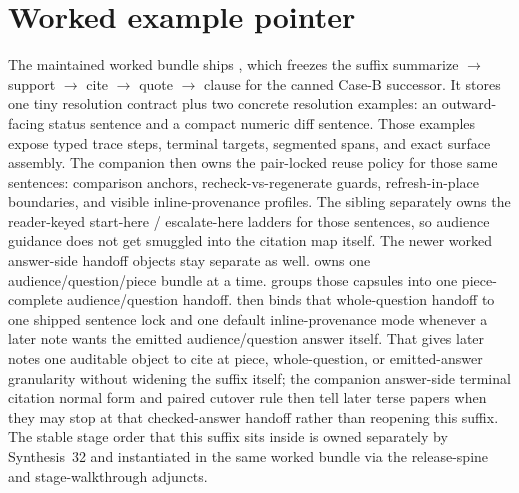 \documentclass[11pt]{article}
\begin{document}
\section{Worked example pointer}
The maintained worked bundle ships , which freezes the suffix
\textsf{summarize} $\to$ \textsf{support} $\to$ \textsf{cite} $\to$ \textsf{quote} $\to$ \textsf{clause}
for the canned Case-B successor.\cite{series:workedexample}
It stores one tiny resolution contract plus two concrete resolution examples: an outward-facing status sentence and a compact numeric diff sentence.
Those examples expose typed trace steps, terminal targets, segmented spans, and exact surface assembly.
The companion  then owns the pair-locked reuse policy for those same sentences: comparison anchors, recheck-vs-regenerate guards, refresh-in-place boundaries, and visible inline-provenance profiles.\cite{series:workedexample,series:sentencelocks}
The sibling  separately owns the reader-keyed start-here / escalate-here ladders for those sentences, so audience guidance does not get smuggled into the citation map itself.\cite{series:workedexample,series:challengeroutes}
The newer worked answer-side handoff objects stay separate as well.
 owns one audience/question/piece bundle at a time.
 groups those capsules into one piece-complete audience/question handoff.
 then binds that whole-question handoff to one shipped sentence lock and one default inline-provenance mode whenever a later note wants the emitted audience/question answer itself.
That gives later notes one auditable object to cite at piece, whole-question, or emitted-answer granularity without widening the suffix itself; the companion answer-side terminal citation normal form and paired cutover rule then tell later terse papers when they may stop at that checked-answer handoff rather than reopening this suffix.\cite{series:workedexample,series:challengeanswercapsules,series:challengeanswersheets,series:challengeanswercards,series:challengeanswerreviewmenus,series:pairedterminalcitationdiscipline,series:pairedterminalcutoverrules}
The stable stage order that this suffix sits inside is owned separately by Synthesis~32 and instantiated in the same worked bundle via the release-spine and stage-walkthrough adjuncts.\cite{series:releasespine,series:workedexample}
\end{document}
